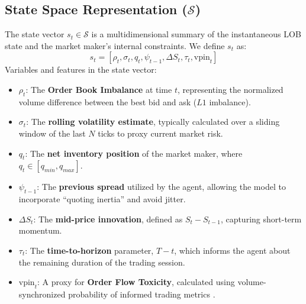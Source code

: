 \subsection{State Space Representation ($\mathcal{S}$)}
The state vector $s_t \in \mathcal{S}$ is a multidimensional summary of the instantaneous LOB state and the market maker's internal constraints. We define $s_t$ as:
\begin{equation}
    s_t = \left[ \rho_t, \sigma_t, q_t, \psi_{t-1}, \Delta S_t, \tau_t, \text{vpin}_t \right]
\end{equation}
Variables and features in the state vector:
\begin{itemize}
    \item $\rho_t$: The \textbf{Order Book Imbalance} at time $t$, representing the normalized volume difference between the best bid and ask ($L1$ imbalance).
    \item $\sigma_t$: The \textbf{rolling volatility estimate}, typically calculated over a sliding window of the last $N$ ticks to proxy current market risk.
    \item $q_t$: The \textbf{net inventory position} of the market maker, where $q_t \in [q_{min}, q_{max}]$.
    \item $\psi_{t-1}$: The \textbf{previous spread} utilized by the agent, allowing the model to incorporate ``quoting inertia'' and avoid jitter.
    \item $\Delta S_t$: The \textbf{mid-price innovation}, defined as $S_t - S_{t-1}$, capturing short-term momentum.
    \item $\tau_t$: The \textbf{time-to-horizon} parameter, $T-t$, which informs the agent about the remaining duration of the trading session.
    \item $\text{vpin}_t$: A proxy for \textbf{Order Flow Toxicity}, calculated using volume-synchronized probability of informed trading metrics \citep{Easley2012}.
\end{itemize}

